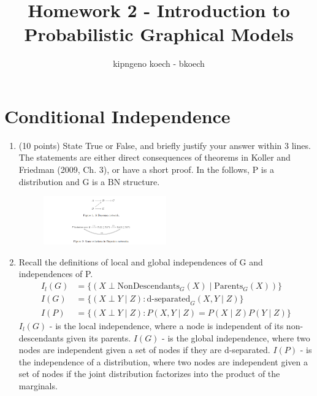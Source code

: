 \documentclass[a3paper,12pt]{extarticle} %
\begin{document}
\author{kipngeno koech - bkoech}
\title{Homework 2 - Introduction to Probabilistic Graphical Models}   
\maketitle

\medskip

\maketitle
\section{Conditional Independence}
\begin{enumerate}
    \item (10 points) State True or False, and briefly justify your answer within 3 lines. The statements are either
    direct consequences of theorems in Koller and Friedman (2009, Ch. 3), or have a short proof. In the
    follows, P is a distribution and G is a BN structure.
    \begin{figure}[h!]
        \centering
        \includegraphics[width=0.5\textwidth]{"conditional_independence.png"}
        \label{fig:example_image}
    \end{figure}
    \item Recall the definitions of local and global independences of G and independences of P.
    \begin{align}
        I_l(G) &= \{(X \perp \text{NonDescendants}_G(X) \mid \text{Parents}_G(X))\} \\
        I(G) &= \{(X \perp Y \mid Z) : \text{d-separated}_G(X, Y \mid Z)\} \\
        I(P) &= \{(X \perp Y \mid Z) : P(X, Y \mid Z) = P(X \mid Z)P(Y \mid Z)\}
    \end{align}
    \(I_l(G)\) - is the local independence, where a node is independent of its non-descendants given its parents. \(I(G)\) - is the global independence, where two nodes are independent given a set of nodes if they are d-separated. \(I(P)\) - is the independence of a distribution, where two nodes are independent given a set of nodes if the joint distribution factorizes into the product of the marginals.

\end{enumerate}
\end{document}
